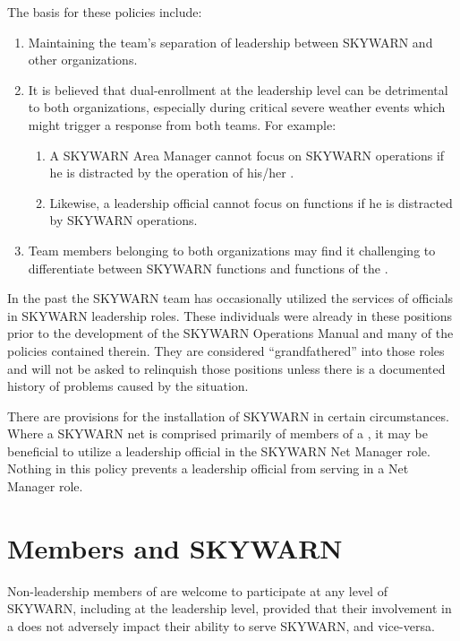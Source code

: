 \documentclass[pdflatex,letterpaper,twoside,12pt]{book}
\begin{document}
The basis for these policies include:

\begin{enumerate}
\item Maintaining the team's separation of leadership between SKYWARN and other organizations.
\item It is believed that dual-enrollment at the leadership level can be detrimental to both organizations, especially during critical severe weather events which might trigger a response from both teams.  For example:
\begin{enumerate}
\item A SKYWARN Area Manager cannot focus on SKYWARN operations if he is distracted by the operation of his/her \tpteam.
\item Likewise, a \tpteam leadership official cannot focus on \tpteam functions if he is distracted by SKYWARN operations.
\end{enumerate}
\item Team members belonging to both organizations may find it challenging to differentiate between SKYWARN functions and functions of the \tpteam.
\end{enumerate}

In the past the SKYWARN team has occasionally utilized the services of \tpteam officials in SKYWARN leadership roles.  These individuals were already in these positions prior to the development of the SKYWARN Operations Manual and many of the policies contained therein.  They are considered ``grandfathered'' into those roles and will not be asked to relinquish those positions unless there is a documented history of problems caused by the situation.

There are provisions for the installation of SKYWARN  in certain circumstances.  Where a SKYWARN net is comprised primarily of members of a \tpteam, it may be beneficial to utilize a \tpteam leadership official in the SKYWARN Net Manager role.  Nothing in this policy prevents a \tpteam leadership official from serving in a Net Manager role.


\section{\tpteam Members and SKYWARN}

Non-leadership members of \tpteams are welcome to participate at any level of SKYWARN, including at the leadership level, provided that their involvement in a \tpteam does not adversely impact their ability to serve SKYWARN, and vice-versa.
\end{document}
